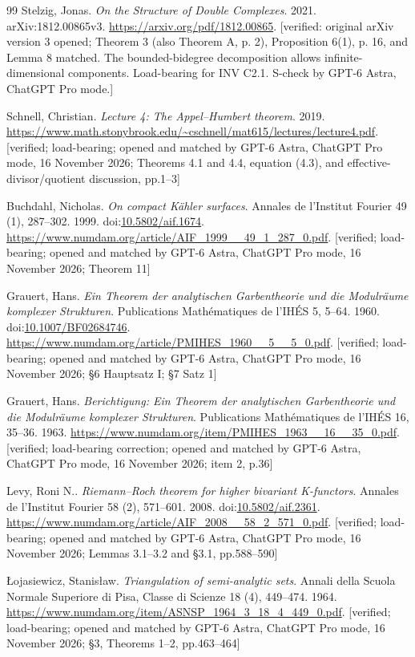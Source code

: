 \begin{thebibliography}{99}
Stelzig, Jonas. \emph{On the Structure of Double Complexes}. 2021. arXiv:1812.00865v3. \url{https://arxiv.org/pdf/1812.00865}. [verified: original arXiv version 3 opened; Theorem 3 (also Theorem A, p. 2), Proposition 6(1), p. 16, and Lemma 8 matched. The bounded-bidegree decomposition allows infinite-dimensional components. Load-bearing for INV C2.1. S-check by GPT-6 Astra, ChatGPT Pro mode.]

Schnell, Christian. \emph{Lecture 4: The {Appel--Humbert} theorem}. 2019. \url{https://www.math.stonybrook.edu/~cschnell/mat615/lectures/lecture4.pdf}. [verified; load-bearing; opened and matched by GPT-6 Astra, ChatGPT Pro mode, 16 November 2026; Theorems 4.1 and 4.4, equation (4.3), and effective-divisor/quotient discussion, pp.1--3]

Buchdahl, Nicholas. \emph{On compact Kähler surfaces}. Annales de l'Institut Fourier 49 (1), 287--302. 1999. doi:\url{10.5802/aif.1674}. \url{https://www.numdam.org/article/AIF_1999__49_1_287_0.pdf}. [verified; load-bearing; opened and matched by GPT-6 Astra, ChatGPT Pro mode, 16 November 2026; Theorem 11]

Grauert, Hans. \emph{Ein Theorem der analytischen Garbentheorie und die Modulräume komplexer Strukturen}. Publications Mathématiques de l'IHÉS 5, 5--64. 1960. doi:\url{10.1007/BF02684746}. \url{https://www.numdam.org/article/PMIHES_1960__5__5_0.pdf}. [verified; load-bearing; opened and matched by GPT-6 Astra, ChatGPT Pro mode, 16 November 2026; \S6 Hauptsatz I; \S7 Satz 1]

Grauert, Hans. \emph{Berichtigung: Ein Theorem der analytischen Garbentheorie und die Modulräume komplexer Strukturen}. Publications Mathématiques de l'IHÉS 16, 35--36. 1963. \url{https://www.numdam.org/item/PMIHES_1963__16__35_0.pdf}. [verified; load-bearing correction; opened and matched by GPT-6 Astra, ChatGPT Pro mode, 16 November 2026; item 2, p.36]

Levy, Roni N.. \emph{Riemann--Roch theorem for higher bivariant {K}-functors}. Annales de l'Institut Fourier 58 (2), 571--601. 2008. doi:\url{10.5802/aif.2361}. \url{https://www.numdam.org/article/AIF_2008__58_2_571_0.pdf}. [verified; load-bearing; opened and matched by GPT-6 Astra, ChatGPT Pro mode, 16 November 2026; Lemmas 3.1--3.2 and \S3.1, pp.588--590]

\L{}ojasiewicz, Stanis{\l}aw. \emph{Triangulation of semi-analytic sets}. Annali della Scuola Normale Superiore di Pisa, Classe di Scienze 18 (4), 449--474. 1964. \url{https://www.numdam.org/item/ASNSP_1964_3_18_4_449_0.pdf}. [verified; load-bearing; opened and matched by GPT-6 Astra, ChatGPT Pro mode, 16 November 2026; \S3, Theorems 1--2, pp.463--464]


\end{thebibliography}
